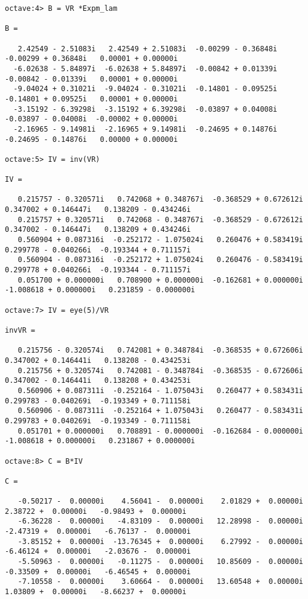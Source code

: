 \documentclass{article}
\begin{document}
\begin{small}
\begin{verbatim}
octave:4> B = VR *Expm_lam

B =

   2.42549 - 2.51083i   2.42549 + 2.51083i  -0.00299 - 0.36848i  -0.00299 + 0.36848i   0.00001 + 0.00000i
  -6.02638 - 5.84897i  -6.02638 + 5.84897i  -0.00842 + 0.01339i  -0.00842 - 0.01339i   0.00001 + 0.00000i
  -9.04024 + 0.31021i  -9.04024 - 0.31021i  -0.14801 - 0.09525i  -0.14801 + 0.09525i   0.00001 + 0.00000i
  -3.15192 - 6.39298i  -3.15192 + 6.39298i  -0.03897 + 0.04008i  -0.03897 - 0.04008i  -0.00002 + 0.00000i
  -2.16965 - 9.14981i  -2.16965 + 9.14981i  -0.24695 + 0.14876i  -0.24695 - 0.14876i   0.00000 + 0.00000i

octave:5> IV = inv(VR)

IV =

   0.215757 - 0.320571i   0.742068 + 0.348767i  -0.368529 + 0.672612i   0.347002 + 0.146447i   0.138209 - 0.434246i
   0.215757 + 0.320571i   0.742068 - 0.348767i  -0.368529 - 0.672612i   0.347002 - 0.146447i   0.138209 + 0.434246i
   0.560904 + 0.087316i  -0.252172 - 1.075024i   0.260476 + 0.583419i   0.299778 - 0.040266i  -0.193344 + 0.711157i
   0.560904 - 0.087316i  -0.252172 + 1.075024i   0.260476 - 0.583419i   0.299778 + 0.040266i  -0.193344 - 0.711157i
   0.051700 + 0.000000i   0.708900 + 0.000000i  -0.162681 + 0.000000i  -1.008618 + 0.000000i   0.231859 - 0.000000i

octave:7> IV = eye(5)/VR

invVR =

   0.215756 - 0.320574i   0.742081 + 0.348784i  -0.368535 + 0.672606i   0.347002 + 0.146441i   0.138208 - 0.434253i
   0.215756 + 0.320574i   0.742081 - 0.348784i  -0.368535 - 0.672606i   0.347002 - 0.146441i   0.138208 + 0.434253i
   0.560906 + 0.087311i  -0.252164 - 1.075043i   0.260477 + 0.583431i   0.299783 - 0.040269i  -0.193349 + 0.711158i
   0.560906 - 0.087311i  -0.252164 + 1.075043i   0.260477 - 0.583431i   0.299783 + 0.040269i  -0.193349 - 0.711158i
   0.051701 + 0.000000i   0.708891 - 0.000000i  -0.162684 - 0.000000i  -1.008618 + 0.000000i   0.231867 + 0.000000i

octave:8> C = B*IV

C =

   -0.50217 -  0.00000i    4.56041 -  0.00000i    2.01829 +  0.00000i    2.38722 +  0.00000i   -0.98493 +  0.00000i
   -6.36228 -  0.00000i   -4.83109 -  0.00000i   12.28998 -  0.00000i   -2.47319 +  0.00000i   -6.76137 -  0.00000i
   -3.85152 +  0.00000i  -13.76345 +  0.00000i    6.27992 -  0.00000i   -6.46124 +  0.00000i   -2.03676 -  0.00000i
   -5.50963 -  0.00000i   -0.11275 -  0.00000i   10.85609 -  0.00000i   -0.33509 +  0.00000i   -6.46545 +  0.00000i
   -7.10558 -  0.00000i    3.60664 -  0.00000i   13.60548 +  0.00000i    1.03809 +  0.00000i   -8.66237 +  0.00000i


\end{verbatim}
\end{small}
\end{document}
